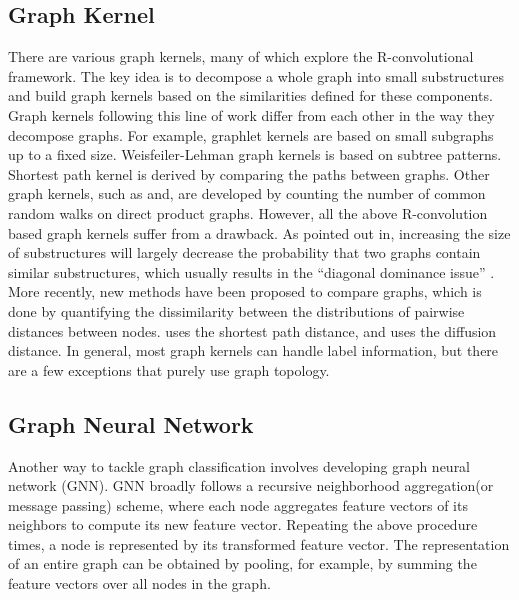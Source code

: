 \documentclass[11pt,onecolumn]{article}
\begin{document}
\subsection{Graph Kernel}
There are various graph kernels, many of which explore the R-convolutional framework\cite{haussler1999convolution}. The key idea is to decompose a whole graph into small substructures and build graph kernels based on the similarities defined for these components. Graph kernels following this line of work differ from each other in the way they decompose graphs. For example, graphlet kernels\cite{shervashidze2009efficient} are based on small subgraphs up to a fixed size. Weisfeiler-Lehman graph kernels\cite{shervashidze2011weisfeiler} is based on subtree patterns. Shortest path kernel\cite{borgwardt2005shortest} is derived by comparing the paths between graphs.  Other graph kernels, such as\cite{vishwanathan2010graph} and\cite{gartner2003graph}, are developed by counting the number of common random walks on direct product graphs. However, all the above R-convolution based graph kernels suffer from a drawback. As pointed out in\cite{yanardag2015structural}, increasing the size of substructures will largely decrease the probability that two graphs contain similar substructures, which usually results in the ``diagonal dominance issue'' \cite{kandola2003reducing}.  More recently, new methods have been proposed to compare graphs, which is done by quantifying the dissimilarity between the distributions of pairwise distances between nodes. \cite{schieber2017quantification} uses the shortest path distance, and\cite{verma2017hunt} uses the diffusion distance. In general, most graph kernels can handle label information, but there are a few exceptions\cite{shervashidze2009efficient, verma2017hunt} that purely use graph topology.

\subsection{Graph Neural Network}
Another way to tackle graph classification involves developing graph neural network (GNN). GNN broadly follows a recursive neighborhood aggregation(or message passing) scheme, where each node aggregates feature vectors of its neighbors to compute its new feature vector. Repeating the above procedure  times, a node is represented by its transformed feature vector. The representation of an entire graph can be obtained by pooling, for example, by summing the feature vectors over all nodes in the graph. 
\end{document}
